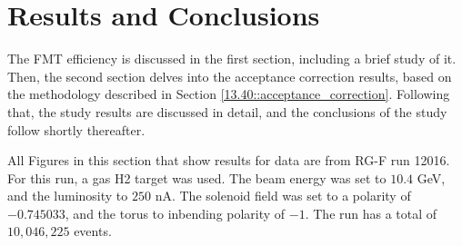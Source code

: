 \section{Results and Conclusions}
\label{14::results_and_conclusions}
    The FMT efficiency is discussed in the first section, including a brief study of it.
    Then, the second section delves into the acceptance correction results, based on the methodology described in Section \ref{13.40::acceptance_correction}.
    Following that, the study results are discussed in detail, and the conclusions of the study follow shortly thereafter.

    All Figures in this section that show results for data are from RG-F run 12016.
    For this run, a gas H2 target was used.
    The beam energy was set to $10.4$ GeV, and the luminosity to $250$ nA.
    The solenoid field was set to a polarity of $-0.745033$, and the torus to inbending polarity of $-1$.
    The run has a total of $10,046,225$ events.

    
    
    
    
    
